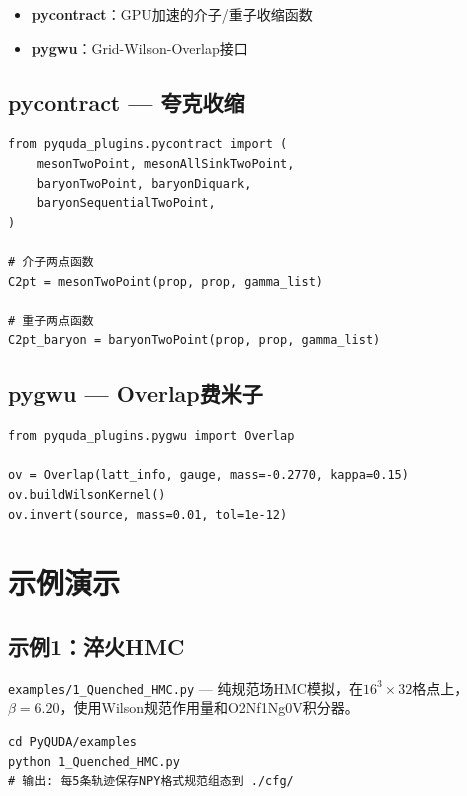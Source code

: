 \documentclass[12pt,a4paper]{ctexart}
\begin{document}
\begin{itemize}[leftmargin=*]
    \item \textbf{pycontract}：GPU加速的介子/重子收缩函数
    \item \textbf{pygwu}：Grid-Wilson-Overlap接口
\end{itemize}

\subsection{pycontract — 夸克收缩}

\begin{lstlisting}[caption={pycontract 收缩函数}]
from pyquda_plugins.pycontract import (
    mesonTwoPoint, mesonAllSinkTwoPoint,
    baryonTwoPoint, baryonDiquark,
    baryonSequentialTwoPoint,
)

# 介子两点函数
C2pt = mesonTwoPoint(prop, prop, gamma_list)

# 重子两点函数
C2pt_baryon = baryonTwoPoint(prop, prop, gamma_list)
\end{lstlisting}

\subsection{pygwu — Overlap费米子}

\begin{lstlisting}[caption={pygwu Overlap接口}]
from pyquda_plugins.pygwu import Overlap

ov = Overlap(latt_info, gauge, mass=-0.2770, kappa=0.15)
ov.buildWilsonKernel()
ov.invert(source, mass=0.01, tol=1e-12)
\end{lstlisting}

\section{示例演示}

\subsection{示例1：淬火HMC}

\texttt{examples/1\_Quenched\_HMC.py} — 纯规范场HMC模拟，在$16^3\times32$格点上，$\beta=6.20$，使用Wilson规范作用量和O2Nf1Ng0V积分器。

\begin{lstlisting}[caption={运行淬火HMC}]
cd PyQUDA/examples
python 1_Quenched_HMC.py
# 输出: 每5条轨迹保存NPY格式规范组态到 ./cfg/
\end{lstlisting}
\end{document}

